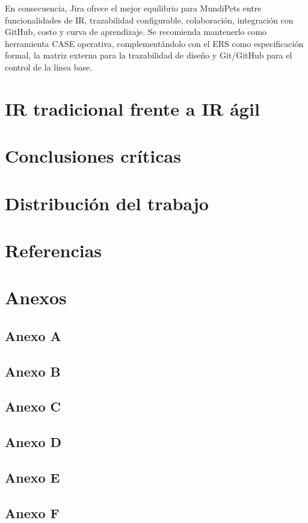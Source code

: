 \documentclass[journal,onecolumn]{IEEEtran}
\begin{document}
	En consecuencia, Jira ofrece el mejor equilibrio para MundiPets entre
	funcionalidades de IR, trazabilidad configurable, colaboración,
	integración con GitHub, costo y curva de aprendizaje. Se recomienda
	mantenerlo como herramienta CASE operativa, complementándolo con el
	ERS como especificación formal, la matriz externa para la
	trazabilidad de diseño y Git/GitHub para el control de la línea base.
	
	\newpage
	\section{IR tradicional frente a IR ágil}
	
	\section{Conclusiones críticas}
	
	\section{Distribución del trabajo}
	
	\newpage
	\section{Referencias}
\printbibliography[heading=none]
	
	\section{Anexos}
	\subsection{Anexo A}
	\subsection{Anexo B}
	\subsection{Anexo C}
	\subsection{Anexo D}
	\subsection{Anexo E}
	\subsection{Anexo F}
	
\end{document}
